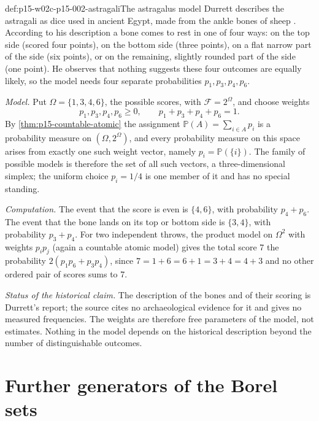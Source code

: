 \begin{hbexample}{def:p15-w02c-p15-002-astragali}{The astragalus model}
Durrett describes the astragali as dice used in ancient Egypt, made from
the ankle bones of sheep \cite[p.~3]{DurrettPTEAuthor2019}. According to
his description a bone comes to rest in one of four ways: on the top side
(scored four points), on the bottom side (three points), on a flat narrow
part of the side (six points), or on the remaining, slightly rounded part
of the side (one point). He observes that nothing suggests these four
outcomes are equally likely, so the model needs four separate
probabilities \(p_1,p_3,p_4,p_6\).

\emph{Model.} Put \(\Omega=\{1,3,4,6\}\), the possible scores, with
\(\mathcal F=2^\Omega\), and choose weights
\[
 p_1,p_3,p_4,p_6\geq0,\qquad p_1+p_3+p_4+p_6=1 .
\]
By \cref{thm:p15-countable-atomic} the assignment
\(\mathbb P(A)=\sum_{i\in A}p_i\) is a probability measure on
\((\Omega,2^\Omega)\), and every probability measure on this space
arises from exactly one such weight vector, namely
\(p_i=\mathbb P(\{i\})\). The family of possible models is therefore the
set of all such vectors, a three-dimensional simplex; the uniform choice
\(p_i=1/4\) is one member of it and has no special standing.

\emph{Computation.} The event that the score is even is \(\{4,6\}\), with
probability \(p_4+p_6\). The event that the bone lands on its top or
bottom side is \(\{3,4\}\), with probability \(p_3+p_4\). For two
independent throws, the product model on \(\Omega^2\) with weights
\(p_ip_j\) (again a countable atomic model) gives the total score 7 the
probability \(2(p_1p_6+p_3p_4)\), since \(7=1+6=6+1=3+4=4+3\) and no
other ordered pair of scores sums to 7.

\emph{Status of the historical claim.} The description of the bones and
of their scoring is Durrett's report; the source cites no archaeological
evidence for it and gives no measured frequencies. The weights are
therefore free parameters of the model, not estimates. Nothing in the
model depends on the historical description beyond the number of
distinguishable outcomes.
\end{hbexample}

\section{Further generators of the Borel sets}
\label{sec:p15-w02c-p15-002-generators}

